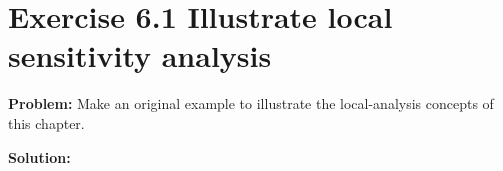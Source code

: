 \section{Exercise 6.1 Illustrate local sensitivity analysis}
\textbf{Problem:} Make an original example to illustrate the local-analysis concepts of this chapter.

\textbf{Solution:} 